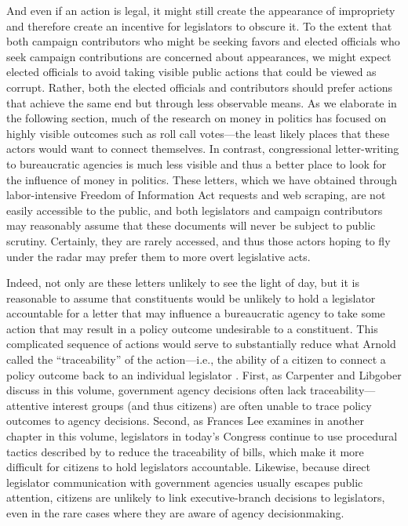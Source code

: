 \documentclass{article}
\begin{document}
And even if an action is legal, it might still create the appearance of impropriety and therefore create an incentive for legislators to obscure it.  To the extent that both campaign contributors who might be seeking favors and elected officials who seek campaign contributions are concerned about appearances, we might expect elected officials to avoid taking visible public actions that could be viewed as corrupt.  Rather, both the elected officials and contributors should prefer actions that achieve the same end but through less observable means. As we elaborate in the following section, much of the research on money in politics has focused on highly visible outcomes such as roll call votes---the least likely places that these actors would want to connect themselves.  In contrast, congressional letter-writing to bureaucratic agencies is much less visible and thus a better place to look for the influence of money in politics.  These letters, which we have obtained through labor-intensive Freedom of Information Act requests and web scraping, are not easily accessible to the public, and both legislators and campaign contributors may reasonably assume that these documents will never be subject to public scrutiny.  Certainly, they are rarely accessed, and thus those actors hoping to fly under the radar may prefer them to more overt legislative acts. 

Indeed, not only are these letters unlikely to see the light of day, but it is reasonable to assume that constituents would be unlikely to hold a legislator accountable for a letter that may influence a bureaucratic agency to take some action that may result in a policy outcome undesirable to a constituent. This complicated sequence of actions would serve to substantially reduce what Arnold called the ``traceability'' of the action---i.e., the ability of a citizen to connect a policy outcome back to an individual legislator \citep{arnold1990lca}. First, as Carpenter and Libgober discuss in this volume, government agency decisions often lack traceability---attentive interest groups (and thus citizens) are often unable to trace policy outcomes to agency decisions. Second, as Frances Lee examines in another chapter in this volume, legislators in today's Congress continue to use procedural tactics described by \citet{arnold1990lca} to reduce the traceability of bills, which make it more difficult for citizens to hold legislators accountable. Likewise, because direct legislator communication with government agencies usually escapes public attention, citizens are unlikely to link executive-branch decisions to legislators, even in the rare cases where they are aware of agency decisionmaking.
\end{document}
